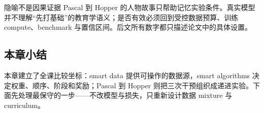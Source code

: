 \begin{warningbox}{隐喻不是因果证据}
Pascal 到 Hopper 的人物故事只帮助记忆实验条件。真实模型并不理解“先打基础”的教育学语义；是否有效必须回到受控数据预算、训练 compute、benchmark 与置信区间。后文所有数字都只描述论文中的具体设置。
\end{warningbox}

\subsection{本章小结}

本章建立了全课比较坐标：smart data 提供可操作的数据源，smart algorithms 决定权重、顺序、阶段和奖励；Pascal 到 Hopper 则把三次干预组织成递进实验。下面先处理最保守的一步——不改模型与损失，只重新设计数据 mixture 与 curriculum。

